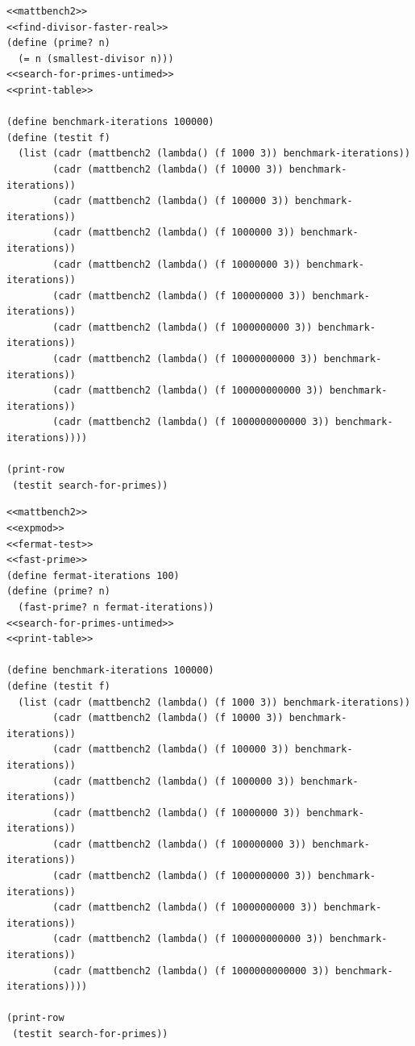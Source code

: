 \documentclass[final,fleqn,titlepage,twoside]{article}
\begin{document}
\begin{verbatim}
<<mattbench2>>
<<find-divisor-faster-real>>
(define (prime? n)
  (= n (smallest-divisor n)))
<<search-for-primes-untimed>>
<<print-table>>

(define benchmark-iterations 100000)
(define (testit f)
  (list (cadr (mattbench2 (lambda() (f 1000 3)) benchmark-iterations))
        (cadr (mattbench2 (lambda() (f 10000 3)) benchmark-iterations))
        (cadr (mattbench2 (lambda() (f 100000 3)) benchmark-iterations))
        (cadr (mattbench2 (lambda() (f 1000000 3)) benchmark-iterations))
        (cadr (mattbench2 (lambda() (f 10000000 3)) benchmark-iterations))
        (cadr (mattbench2 (lambda() (f 100000000 3)) benchmark-iterations))
        (cadr (mattbench2 (lambda() (f 1000000000 3)) benchmark-iterations))
        (cadr (mattbench2 (lambda() (f 10000000000 3)) benchmark-iterations))
        (cadr (mattbench2 (lambda() (f 100000000000 3)) benchmark-iterations))
        (cadr (mattbench2 (lambda() (f 1000000000000 3)) benchmark-iterations))))

(print-row
 (testit search-for-primes))
\end{verbatim}

\begin{verbatim}
<<mattbench2>>
<<expmod>>
<<fermat-test>>
<<fast-prime>>
(define fermat-iterations 100)
(define (prime? n)
  (fast-prime? n fermat-iterations))
<<search-for-primes-untimed>>
<<print-table>>

(define benchmark-iterations 100000)
(define (testit f)
  (list (cadr (mattbench2 (lambda() (f 1000 3)) benchmark-iterations))
        (cadr (mattbench2 (lambda() (f 10000 3)) benchmark-iterations))
        (cadr (mattbench2 (lambda() (f 100000 3)) benchmark-iterations))
        (cadr (mattbench2 (lambda() (f 1000000 3)) benchmark-iterations))
        (cadr (mattbench2 (lambda() (f 10000000 3)) benchmark-iterations))
        (cadr (mattbench2 (lambda() (f 100000000 3)) benchmark-iterations))
        (cadr (mattbench2 (lambda() (f 1000000000 3)) benchmark-iterations))
        (cadr (mattbench2 (lambda() (f 10000000000 3)) benchmark-iterations))
        (cadr (mattbench2 (lambda() (f 100000000000 3)) benchmark-iterations))
        (cadr (mattbench2 (lambda() (f 1000000000000 3)) benchmark-iterations))))

(print-row
 (testit search-for-primes))
\end{verbatim}
\end{document}

